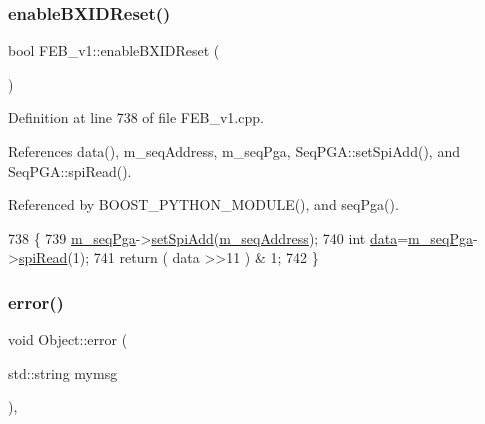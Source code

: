 \subsubsection{\texorpdfstring{enable\+B\+X\+I\+D\+Reset()}{enableBXIDReset()}}
{\footnotesize\ttfamily bool F\+E\+B\+\_\+v1\+::enable\+B\+X\+I\+D\+Reset (\begin{DoxyParamCaption}{ }\end{DoxyParamCaption})}



Definition at line 738 of file F\+E\+B\+\_\+v1.\+cpp.



References data(), m\+\_\+seq\+Address, m\+\_\+seq\+Pga, Seq\+P\+G\+A\+::set\+Spi\+Add(), and Seq\+P\+G\+A\+::spi\+Read().



Referenced by B\+O\+O\+S\+T\+\_\+\+P\+Y\+T\+H\+O\+N\+\_\+\+M\+O\+D\+U\+L\+E(), and seq\+Pga().


\begin{DoxyCode}
738                              \{
739   \hyperlink{classFEB__v1_a6c7804ac86796f233a8393043adf2e77}{m\_seqPga}->\hyperlink{classSeqPGA_ac998ce3a6d9b5f2e88cc8393f8c1df53}{setSpiAdd}(\hyperlink{classFEB__v1_a1c1eb093fd1733b9510fcf8bc5c7ad08}{m\_seqAddress});
740   \textcolor{keywordtype}{int} \hyperlink{classFEB__v1_a6bca4320bd3bbbc32efc81097f33421a}{data}=\hyperlink{classFEB__v1_a6c7804ac86796f233a8393043adf2e77}{m\_seqPga}->\hyperlink{classSeqPGA_ab3d0e5e5d4014bc7a92588a76b8713d4}{spiRead}(1);
741   \textcolor{keywordflow}{return} ( data >>11 ) & 1;
742 \}
\end{DoxyCode}
\mbox{\label{classObject_a204a95f57818c0f811933917a30eff45}} 
\subsubsection{\texorpdfstring{error()}{error()}\hspace{0.1cm}{\footnotesize\ttfamily [1/2]}}
{\footnotesize\ttfamily void Object\+::error (\begin{DoxyParamCaption}\item[{std\+::string}]{mymsg }\end{DoxyParamCaption})\hspace{0.3cm}{\ttfamily [inline]}, {\ttfamily [inherited]}}



